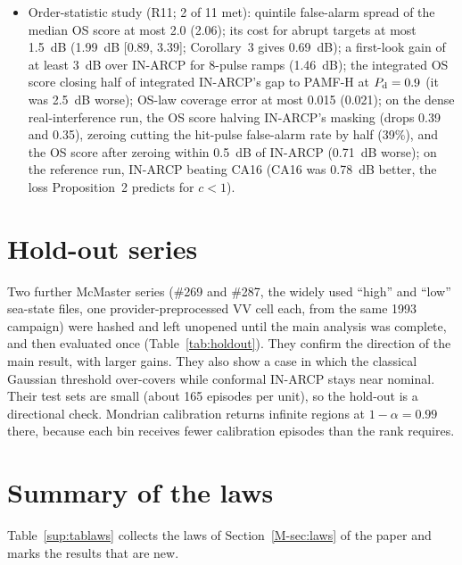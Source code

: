 \documentclass[10pt]{article}
\begin{document}
\begin{itemize}
\item Order-statistic study (R11; 2 of 11 met): quintile false-alarm spread of the median OS score at most 2.0 (2.06); its cost for abrupt targets at most 1.5~dB (1.99~dB [0.89, 3.39]; Corollary~3 gives 0.69~dB); a first-look gain of at least 3~dB over IN-ARCP for 8-pulse ramps (1.46~dB); the integrated OS score closing half of integrated IN-ARCP's gap to PAMF-H at $P_{\rm d}=0.9$ (it was 2.5~dB worse); OS-law coverage error at most 0.015 (0.021); on the dense real-interference run, the OS score halving IN-ARCP's masking (drops 0.39 and 0.35), zeroing cutting the hit-pulse false-alarm rate by half (39\%), and the OS score after zeroing within 0.5~dB of IN-ARCP (0.71~dB worse); on the reference run, IN-ARCP beating CA16 (CA16 was 0.78~dB better, the loss Proposition~2 predicts for $c<1$).
\end{itemize}

\section{Hold-out series}
Two further McMaster series (\#269 and \#287, the widely used ``high'' and ``low'' sea-state files, one provider-preprocessed VV cell each, from the same 1993 campaign) were hashed and left unopened until the main analysis was complete, and then evaluated once (Table~\ref{tab:holdout}). They confirm the direction of the main result, with larger gains. They also show a case in which the classical Gaussian threshold over-covers while conformal IN-ARCP stays near nominal. Their test sets are small (about 165 episodes per unit), so the hold-out is a directional check. Mondrian calibration returns infinite regions at $1-\alpha=0.99$ there, because each bin receives fewer calibration episodes than the rank requires.
\begin{table}[h]
\centering\small
\caption{Hold-out series \#269 and \#287 ($1-\alpha=0.90$; six units per column).}
\label{tab:holdout}

\end{table}

\section{Summary of the laws}\label{sup:laws}
Table~\ref{sup:tablaws} collects the laws of Section~\ref{M-sec:laws} of the paper and marks the results that are new.
\end{document}
